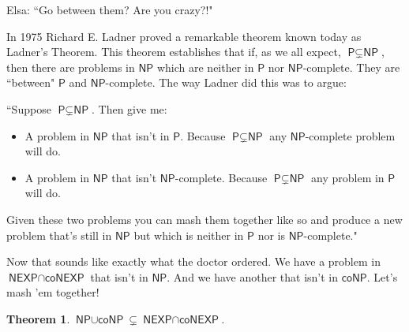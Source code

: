 \documentclass{article}
\newtheorem{theorem}{Theorem}
\newcommand{\Poly}{\ensuremath{\textsf{P}}}
\newcommand{\NP}{\ensuremath{\textsf{NP}}}
\newcommand{\coNP}{\ensuremath{\textsf{coNP}}}
\newcommand{\interEXP}{\ensuremath{\textsf{NEXP}\cap\textsf{coNEXP}}}
\newcommand{\unionP}{\ensuremath{\textsf{NP}\cup\textsf{coNP}}}
\begin{document}
Elsa: ``Go between them? Are you crazy?!"

In 1975 Richard E. Ladner proved a remarkable theorem known today as Ladner's Theorem.\cite{ladner} This theorem establishes that if, as we all expect, $\Poly \subsetneq \NP$, then there are problems in $\NP$ which are neither in $\Poly$ nor $\NP$-complete. They are ``between" $\Poly$ and $\NP$-complete. The way Ladner did this was to argue:

\noindent
``Suppose $\Poly \subsetneq \NP$. Then give me:
\begin{itemize}
\item A problem in $\NP$ that isn't in $\Poly$. Because $\Poly \subsetneq \NP$ any $\NP$-complete problem will do.
\item A problem in $\NP$ that isn't $\NP$-complete. Because $\Poly \subsetneq \NP$ any problem in $\Poly$ will do.
\end{itemize}
Given these two problems you can mash them together like so and produce a new problem that's still in $\NP$ but which is neither in $\Poly$ nor is $\NP$-complete."

Now that sounds like exactly what the doctor ordered. We have a problem in $\interEXP$ that isn't in $\NP$. And we have another that isn't in $\coNP$. Let's mash 'em together!

\begin{theorem}
$\unionP \subsetneq \interEXP$.
\end{theorem}
\end{document}
